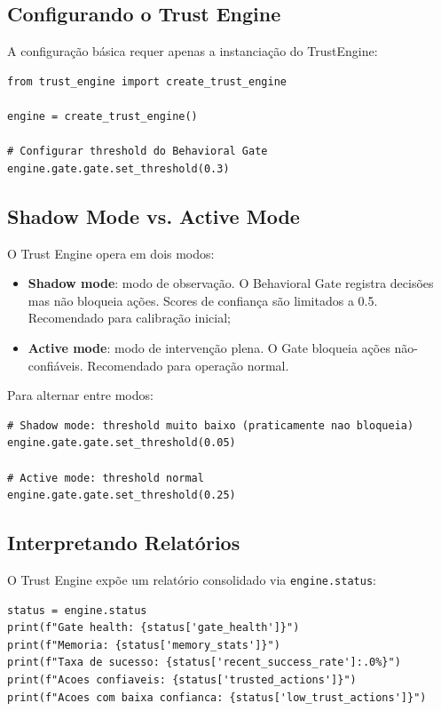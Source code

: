 \subsection{Configurando o Trust Engine}

A configuração básica requer apenas a instanciação do TrustEngine:

\begin{lstlisting}[style=pythonstyle]
from trust_engine import create_trust_engine

engine = create_trust_engine()

# Configurar threshold do Behavioral Gate
engine.gate.gate.set_threshold(0.3)
\end{lstlisting}

\subsection{Shadow Mode vs. Active Mode}

O Trust Engine opera em dois modos:

\begin{itemize}
\item \textbf{Shadow mode}: modo de observação. O Behavioral Gate
registra decisões mas não bloqueia ações. Scores de confiança são
limitados a 0.5. Recomendado para calibração inicial;
\item \textbf{Active mode}: modo de intervenção plena. O Gate bloqueia
ações não-confiáveis. Recomendado para operação normal.
\end{itemize}

Para alternar entre modos:
\begin{lstlisting}[style=pythonstyle]
# Shadow mode: threshold muito baixo (praticamente nao bloqueia)
engine.gate.gate.set_threshold(0.05)

# Active mode: threshold normal
engine.gate.gate.set_threshold(0.25)
\end{lstlisting}

\subsection{Interpretando Relatórios}

O Trust Engine expõe um relatório consolidado via \lstinline{engine.status}:

\begin{lstlisting}[style=pythonstyle]
status = engine.status
print(f"Gate health: {status['gate_health']}")
print(f"Memoria: {status['memory_stats']}")
print(f"Taxa de sucesso: {status['recent_success_rate']:.0%}")
print(f"Acoes confiaveis: {status['trusted_actions']}")
print(f"Acoes com baixa confianca: {status['low_trust_actions']}")
\end{lstlisting}


